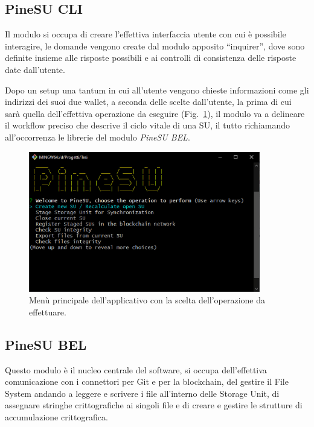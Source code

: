 \subsection{PineSU CLI}

Il modulo si occupa di creare l'effettiva interfaccia utente con cui è possibile interagire,
le domande vengono create dal modulo apposito “inquirer”, dove sono definite
insieme alle risposte possibili e ai controlli di consistenza delle risposte date dall'utente.

Dopo un setup una tantum in cui all'utente vengono chieste informazioni come gli indirizzi dei
suoi due wallet, a seconda delle scelte dall'utente, la prima di cui sarà quella dell'effettiva
operazione da eseguire (Fig.~\ref{fi:menu}), il modulo va a delineare il workflow preciso che descrive il ciclo vitale
di una SU, il tutto richiamando all'occorrenza le librerie del modulo \emph{PineSU BEL}. 

\begin{figure}[H]
    \centering
    \includegraphics[width=0.9\textwidth]{Figures/menu}
    \caption{\small{
    Menù principale dell'applicativo con la scelta dell'operazione da effettuare.
    } %
    } %
    \label{fi:menu}
\end{figure}


\subsection{PineSU BEL}

Questo modulo è il nucleo centrale del software, si occupa dell'effettiva comunicazione con i connettori per Git e per la blockchain, del gestire il File System andando a leggere e scrivere i file all'interno delle Storage Unit, di assegnare stringhe crittografiche ai singoli file e di creare e gestire le strutture di accumulazione crittografica.


